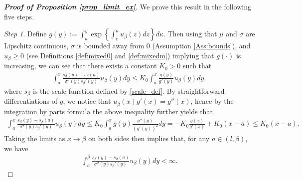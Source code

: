 \documentclass[11pt]{article} %
\numberwithin{komcounter}{section}
\begin{document}
\begin{proof}[\bf Proof of Proposition \ref{prop_limit_ex}]
We prove this result in the following five steps. 

\vspace{1mm}
{\it Step 1}. 
Define $g(y) := \int_{a}^{y} \exp \left\{\int_{c}^{\kappa} u_\beta(z) dz \right\} d\kappa$. 
Then using that $\mu$ and $\sigma$ are Lipschitz continuous, $\sigma$ is bounded away from $0$ (Assumption \ref{Ass:bounds}), and $u_\beta \geq 0$ (see Definitions \ref{def:mixed0} and \ref{def:mixedm}) implying that $g(\cdot)$ is increasing, 
we can see that there exists a constant $K_0>0$ such that
\begin{align*}
\int_a^x \frac{s_\beta(y)-s_\beta(a)}{\sigma^2(y)s_\beta'(y)}u_\beta(y) dy 
\leq K_0 \int_a^x\frac{g(y)}{g'(y)}u_\beta(y)dy ,
\end{align*}
where $s_\beta$ is the scale function defined by \eqref{scale_def}. 
By straightforward differentiations of $g$, we    notice that $u_\beta(x)g'(x)=g''(x)$, hence by the integration by parts formula the above inequality further yields that 
\begin{align*}
\int_a^x \frac{s_\beta(y)-s_\beta(a)}{\sigma^2(y)s_\beta'(y)}u_\beta(y) dy 
\leq K_0 \int_a^x g(y) \frac{g''(y)}{(g'(y))^2}dy 
= - K_0 \frac{g(x)}{g'(x)} + K_0 (x-a)
\leq K_0 (x-a).
\end{align*}
Taking the limits as $x\to\beta$ on both sides then implies that, for any $a\in (l,\beta)$, we have \begin{align} \label{help_lemma_limit}
\int_a^\beta\frac{s_\beta(y)-s_\beta(a)}{\sigma^2(y)s_\beta'(y)}u_\beta(y)dy<\infty.
\end{align}


\end{proof}
\end{document}
